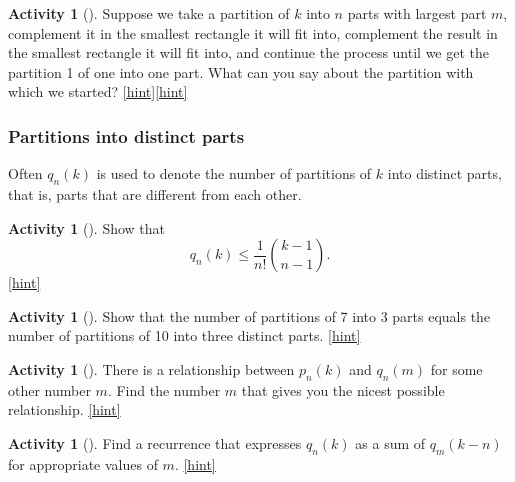 \documentclass[10pt,]{book}
\theoremstyle{plain}
\theoremstyle{definition}
\theoremstyle{definition}
\theoremstyle{definition}
\newtheorem{activity}[project]{Activity}
\numberwithin{equation}{chapter}
\begin{document}
\begin{activity}[]\label{activity-302}
\hypertarget{p-1531}{}%
Suppose we take a partition of \(k\) into \(n\) parts with largest part \(m\), complement it in the smallest rectangle it will fit into, complement the result in the smallest rectangle it will fit into, and continue the process until we get the partition 1 of one into one part.  What can you say about the partition with which we started?%
\hfill{\tiny\hyperlink{a-309}{[hint]}\hypertarget{q-309}{}}\hfill{\tiny\hyperlink{a-309}{[hint]}\hypertarget{q-309}{}}\end{activity}
\typeout{************************************************}
\typeout{************************************************}
\subsubsection[{Partitions into distinct parts}]{Partitions into distinct parts}\label{subsubsection-1}
\hypertarget{p-1538}{}%
Often \(q_n(k)\) is used to denote the number of partitions of \(k\) into distinct parts, that is, parts that are different from each other.%
\begin{activity}[]\label{activity-303}
\hypertarget{p-1539}{}%
Show that%
\begin{equation*}
q_n(k) \le \frac{1}{n!}\binom{k-1}{n-1}.
\end{equation*}
%
\hfill{\tiny\hyperlink{a-310}{[hint]}\hypertarget{q-310}{}}\end{activity}
\begin{activity}[]\label{activity-304}
\hypertarget{p-1542}{}%
Show that the number of partitions of 7 into 3 parts equals the number of partitions of 10 into three distinct parts.%
\hfill{\tiny\hyperlink{a-311}{[hint]}\hypertarget{q-311}{}}\end{activity}
\begin{activity}[]\label{activity-305}
\hypertarget{p-1545}{}%
There is a relationship between \(p_n(k)\) and \(q_n(m)\) for some other number \(m\). Find the number \(m\) that gives you the nicest possible relationship.%
\hfill{\tiny\hyperlink{a-312}{[hint]}\hypertarget{q-312}{}}\end{activity}
\begin{activity}[]\label{activity-306}
\hypertarget{p-1548}{}%
Find a recurrence that expresses \(q_n(k)\) as a sum of \(q_m(k-n)\) for appropriate values of \(m\).%
\hfill{\tiny\hyperlink{a-313}{[hint]}\hypertarget{q-313}{}}\end{activity}
\end{document}
